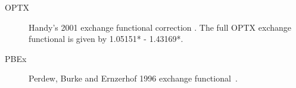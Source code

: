 \begin{description}
\begin{description}






\item[OPTX] Handy's 2001 exchange functional correction \cite{dft:optx}. The full OPTX exchange functional is given by 1.05151* - 1.43169*.

\item[PBEx] Perdew, Burke and Ernzerhof 1996 exchange functional~\cite{dft:pbe}.




\end{description}
\end{description}
